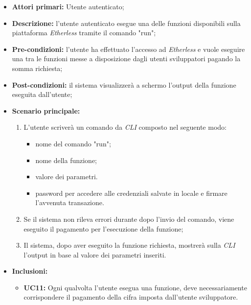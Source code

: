 \begin{itemize}
	\item \textbf{Attori primari:} Utente autenticato;
	\item \textbf{Descrizione:} l'utente autenticato esegue una delle funzioni disponibili sulla piattaforma \textit{Etherless} tramite il comando "run";
	\item \textbf{Pre-condizioni:} l'utente ha effettuato l'accesso ad \textit{Etherless} e vuole eseguire una tra le funzioni messe a disposizione dagli utenti sviluppatori pagando la somma richiesta;
	\item \textbf{Post-condizioni:} il sistema visualizzerà a schermo l'output della funzione eseguita dall'utente;
	\item \textbf{Scenario principale:}
	\begin{enumerate}
		\item L'utente scriverà un comando da \textit{CLI\glo} composto nel seguente modo:
		\begin{itemize}
			\item nome del comando "run";
			\item nome della funzione;
			\item valore dei parametri.
			\item password per accedere alle credenziali salvate in locale e firmare l'avvenuta transazione.
		\end{itemize}
		\item Se il sistema non rileva errori durante dopo l'invio del comando, viene eseguito il pagamento per l'esecuzione della funzione;
		\item Il sistema, dopo aver eseguito la funzione richiesta, mostrerà sulla \textit{CLI\glo} l'output in base al valore dei parametri inseriti.
	\end{enumerate}
	\item \textbf{Inclusioni:}
	\begin{itemize}
		\item \textbf{UC11:} Ogni qualvolta l'utente esegua una funzione, deve necessariamente corrispondere il pagamento della cifra imposta dall'utente sviluppatore.
	\end{itemize}
\end{itemize}
